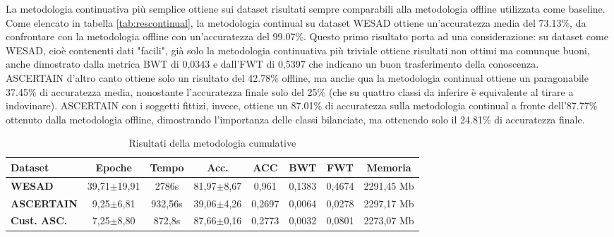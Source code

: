 La metodologia continuativa più semplice ottiene sui dataset risultati sempre comparabili alla metodologia offline utilizzata come baseline. Come elencato in tabella \ref{tab:rescontinual}, la metodologia continual su dataset WESAD ottiene un'accuratezza media del 73.13\%, da confrontare con la metodologia offline con un'accuratezza del 99.07\%. Questo primo risultato porta ad una considerazione: su dataset come WESAD, cioè contenenti dati "facili", già solo la metodologia continuativa più triviale ottiene risultati non ottimi ma comunque buoni, anche dimostrato dalla metrica BWT di 0,0343 e dall'FWT di 0,5397 che indicano un buon trasferimento della conoscenza.\\
ASCERTAIN d'altro canto ottiene solo un risultato del 42.78\% offline, ma anche qua la metodologia continual ottiene un paragonabile 37.45\% di accuratezza media, nonostante l'accuratezza finale solo del 25\% (che su quattro classi da inferire è equivalente al tirare a indovinare). ASCERTAIN con i soggetti fittizi, invece, ottiene un 87.01\% di accuratezza sulla metodologia continual a fronte dell'87.77\% ottenuto dalla metodologia offline, dimostrando l'importanza delle classi bilanciate, ma ottenendo solo il 24.81\% di accuratezza finale.

\begin{table}[h]
\footnotesize
    \begin{tabular}{l|c|c|c|c|c|c|c}
        \textbf{Dataset} & \textbf{Epoche} & \textbf{Tempo} & \textbf{Acc.} & \textbf{ACC} & \textbf{BWT} & \textbf{FWT} & \textbf{Memoria}\\
        \hline
        \textbf{WESAD} & 39,71$\pm$19,91 & 2786s & 81,97$\pm$8,67 & 0,961 & 0,1383 & 0,4674 & 2291,45 Mb\\
        \textbf{ASCERTAIN} & 9,25$\pm$6,81 & 932,56s & 39,06$\pm$4,26 & 0,2697 & 0,0064 & 0,0278 & 2297,17 Mb\\
        \textbf{Cust. ASC.} & 7,25$\pm$8,80 & 872,8s & 87,66$\pm$0,16 & 0,2773 & 0,0032 & 0,0801 & 2273,07 Mb\\
    \end{tabular}
    \caption{Risultati della metodologia cumulative}
    \label{tab:rescumulative}
\end{table}

